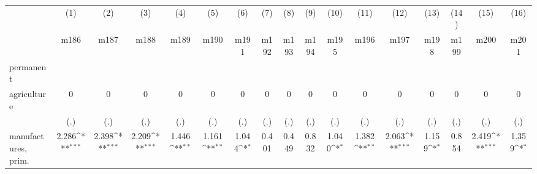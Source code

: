 {
\def\sym#1{\ifmmode^{#1}\else\(^{#1}\)\fi}
\begin{tabular}{l*{16}{c}}
\hline\hline
                    &\multicolumn{1}{c}{(1)}&\multicolumn{1}{c}{(2)}&\multicolumn{1}{c}{(3)}&\multicolumn{1}{c}{(4)}&\multicolumn{1}{c}{(5)}&\multicolumn{1}{c}{(6)}&\multicolumn{1}{c}{(7)}&\multicolumn{1}{c}{(8)}&\multicolumn{1}{c}{(9)}&\multicolumn{1}{c}{(10)}&\multicolumn{1}{c}{(11)}&\multicolumn{1}{c}{(12)}&\multicolumn{1}{c}{(13)}&\multicolumn{1}{c}{(14)}&\multicolumn{1}{c}{(15)}&\multicolumn{1}{c}{(16)}\\
                    &\multicolumn{1}{c}{m186}&\multicolumn{1}{c}{m187}&\multicolumn{1}{c}{m188}&\multicolumn{1}{c}{m189}&\multicolumn{1}{c}{m190}&\multicolumn{1}{c}{m191}&\multicolumn{1}{c}{m192}&\multicolumn{1}{c}{m193}&\multicolumn{1}{c}{m194}&\multicolumn{1}{c}{m195}&\multicolumn{1}{c}{m196}&\multicolumn{1}{c}{m197}&\multicolumn{1}{c}{m198}&\multicolumn{1}{c}{m199}&\multicolumn{1}{c}{m200}&\multicolumn{1}{c}{m201}\\
\hline
permanent           &                     &                     &                     &                     &                     &                     &                     &                     &                     &                     &                     &                     &                     &                     &                     &                     \\
agriculture         &           0         &           0         &           0         &           0         &           0         &           0         &           0         &           0         &           0         &           0         &           0         &           0         &           0         &           0         &           0         &           0         \\
                    &         (.)         &         (.)         &         (.)         &         (.)         &         (.)         &         (.)         &         (.)         &         (.)         &         (.)         &         (.)         &         (.)         &         (.)         &         (.)         &         (.)         &         (.)         &         (.)         \\
[1em]
manufactures, prim. &       2.286\sym{***}&       2.398\sym{***}&       2.209\sym{***}&       1.446\sym{**} &       1.161\sym{**} &       1.044\sym{*}  &       0.401         &       0.449         &       0.832         &       1.040\sym{*}  &       1.382\sym{**} &       2.063\sym{***}&       1.159\sym{*}  &       0.854         &       2.419\sym{***}&       1.359\sym{*}  \\

\end{tabular}}

